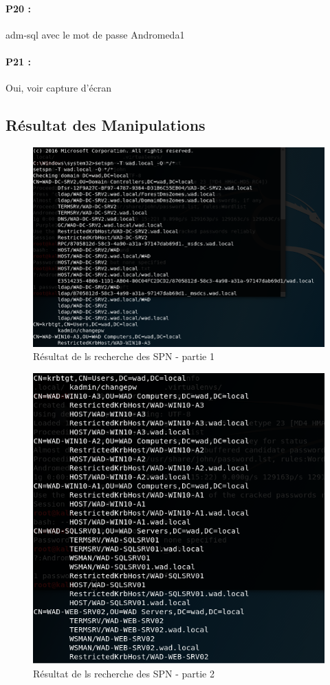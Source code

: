 \documentclass[12pt]{report} %
\begin{document}
\paragraph{P20 :} adm-sql avec le mot de passe Andromeda1
\paragraph{P21 :} Oui, voir capture d'écran


\subsection*{Résultat des Manipulations}

\begin{figure}[!h]
	\includegraphics[width=17cm]{SPN_command_a.PNG}
	\caption*{Résultat de ls recherche des SPN - partie 1}
\end{figure}

\begin{figure}[!h]
	\includegraphics[width=17cm]{SPN_command_b.PNG}
	\caption*{Résultat de ls recherche des SPN - partie 2}
\end{figure}
\end{document}
